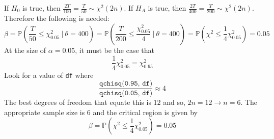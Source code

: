 \documentclass[12pt]{article}
\begin{document}
\begin{enumerate}
If $H_0$ is true, then $\frac{2T}{100} = \frac{T}{50} \sim \chi^2(2n)$. If $H_A$ is true, then $\frac{2T}{400} = \frac{T}{200} \sim \chi^2(2n)$. Therefore the following is needed:
$$ \beta = \mathbb{P}\left( \frac{T}{50} \leq \chi^2_{0.05} ~|~ \theta = 400\right) = \mathbb{P}\left( \frac{T}{200} \leq \frac{\chi^2_{0.05}}{4} ~|~ \theta = 400\right) = \mathbb{P}\left(\chi^2 \leq \frac{1}{4} \chi^2_{0.05}\right) = 0.05$$ 
At the size of $\alpha = 0.05$, it must be the case that $$ \frac{1}{4}\chi^2_{0.05} = \chi^2_{0.95} $$ 
Look for a value of \texttt{df} where $$ \frac{\texttt{qchisq(0.95, df)}}{\texttt{qchisq(0.05, df)}} \approx 4 $$ The best degrees of freedom that equate this is $12$ and so, $2n = 12 \to n = 6$. The appropriate sample size is $6$ and the critical region is given by $$ \beta = \mathbb{P}\left(\chi^2 \leq \frac{1}{4} \chi^2_{0.05}\right) = 0.05$$ 
\end{enumerate}
\end{document}
